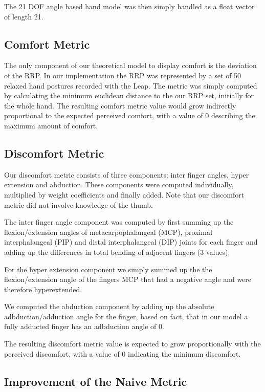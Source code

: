 \documentclass{sig-alternate-05-2015}
\begin{document}
The 21 DOF angle based hand model was then simply handled as a float vector of length 21. 

\subsection{Comfort Metric}

The only component of our theoretical model to display comfort is the deviation of the RRP. In our implementation the RRP was represented by a set of 50 relaxed hand postures recorded with the Leap. The metric was simply computed by calculating the minimum euclidean distance to the our RRP set, initially for the whole hand.
The resulting comfort metric value would grow indirectly proportional to the expected perceived comfort, with a value of 0 describing the maximum amount of comfort. 


\subsection{Discomfort Metric}

Our discomfort metric consists of three components: inter finger angles, hyper extension and abduction. These components were computed individually, multiplied by weight coefficients and finally added. Note that our discomfort metric did not involve knowledge of the thumb.

The inter finger angle component was computed by first summing up the flexion/extension angles of metacarpophalangeal (MCP), proximal interphalangeal (PIP) and distal interphalangeal (DIP) joints for each finger and adding up the differences in total bending of adjacent fingers (3 values). 

For the hyper extension component we simply summed up the the flexion/extension angle of the fingers MCP that had a negative angle and were therefore hyperextended.

We computed the abduction component by adding up the absolute adbduction/adduction angle for the finger, based on fact, that in our model a fully adducted finger has an adbduction angle of 0.

The resulting discomfort metric value is expected to grow proportionally with the perceived discomfort, with a value of 0 indicating the minimum discomfort. 

\subsection{Improvement of the Naive Metric}
\end{document}

